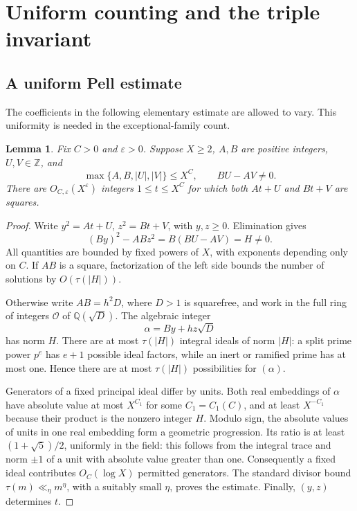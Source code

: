 \documentclass[11pt,a4paper]{article}
\numberwithin{equation}{section}
\newtheorem{lemma}[theorem]{Lemma}
\theoremstyle{remark}
\newcommand{\Z}{\mathbb Z}
\newcommand{\Q}{\mathbb Q}
\newcommand{\eps}{\varepsilon}
\begin{document}
\section{Uniform counting and the triple invariant}\label{sec:tools}
\subsection{A uniform Pell estimate}
The coefficients in the following elementary estimate are allowed to vary. This uniformity is needed in the exceptional-family count.

\begin{lemma}\label{lem:pell}
Fix $C>0$ and $\eps>0$. Suppose $X\ge2$, $A,B$ are positive integers, $U,V\in\Z$, and
\[
\max\{A,B,|U|,|V|\}\le X^C,\qquad BU-AV\ne0.
\]
There are $O_{C,\eps}(X^\eps)$ integers $1\le t\le X^C$ for which both $At+U$ and $Bt+V$ are squares.
\end{lemma}
\begin{proof}
Write $y^2=At+U$, $z^2=Bt+V$, with $y,z\ge0$. Elimination gives
\begin{equation}\label{eq:pell}
(By)^2-ABz^2=B(BU-AV)=H\ne0.
\end{equation}
All quantities are bounded by fixed powers of $X$, with exponents depending only on $C$. If $AB$ is a square, factorization of the left side bounds the number of solutions by $O(\tau(|H|))$.

Otherwise write $AB=h^2D$, where $D>1$ is squarefree, and work in the full ring of integers $\mathcal O$ of $\Q(\sqrt D)$. The algebraic integer
\[
\alpha=By+hz\sqrt D
\]
has norm $H$. There are at most $\tau(|H|)$ integral ideals of norm $|H|$: a split prime power $p^e$ has $e+1$ possible ideal factors, while an inert or ramified prime has at most one. Hence there are at most $\tau(|H|)$ possibilities for $(\alpha)$.

Generators of a fixed principal ideal differ by units. Both real embeddings of $\alpha$ have absolute value at most $X^{C_1}$ for some $C_1=C_1(C)$, and at least $X^{-C_1}$ because their product is the nonzero integer $H$. Modulo sign, the absolute values of units in one real embedding form a geometric progression. Its ratio is at least $(1+\sqrt5)/2$, uniformly in the field: this follows from the integral trace and norm $\pm1$ of a unit with absolute value greater than one. Consequently a fixed ideal contributes $O_C(\log X)$ permitted generators. The standard divisor bound $\tau(m)\ll_\eta m^\eta$, with a suitably small $\eta$, proves the estimate. Finally, $(y,z)$ determines $t$.
\end{proof}
\end{document}
